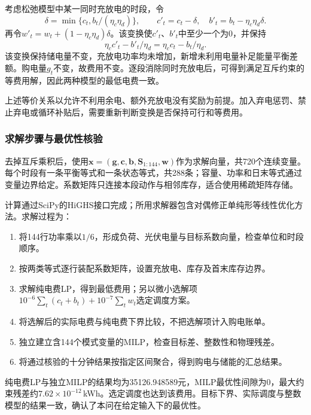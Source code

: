 考虑松弛模型中某一同时充放电的时段，令
\begin{equation}
 \delta=\min\{c_t,b_t/(\eta_c\eta_d)\},\qquad
 c'_t=c_t-\delta,\quad b'_t=b_t-\eta_c\eta_d\delta.\label{eq:cycle-remove}
\end{equation}
再令$w'_t=w_t+(1-\eta_c\eta_d)\delta$。该变换使$c'_t$、$b'_t$中至少一个为0，并保持
\begin{equation}
 \eta_cc'_t-b'_t/\eta_d=\eta_cc_t-b_t/\eta_d.
\end{equation}
该变换保持储电量不变，充放电功率均未增加，新增未利用电量补足能量平衡差额。购电量$g_t$不变，故费用不变。逐段消除同时充放电后，可得到满足互斥约束的等费用解，因此两种模型的最低电费一致。

上述等价关系以允许不利用余电、额外充放电没有奖励为前提。加入弃电惩罚、禁止弃电或循环补贴后，需要重新判断变换是否保持可行和等费用。

\subsubsection{求解步骤与最优性核验}
去掉互斥乘积后，使用$\boldsymbol x=(\boldsymbol g,\boldsymbol c,\boldsymbol b,\boldsymbol S_{1:144},\boldsymbol w)$作为求解向量，共720个连续变量。每个时段有一条平衡等式和一条状态等式，共288条；容量、功率和日末等式通过变量边界给定。系数矩阵只连接本段动作与相邻库存，适合使用稀疏矩阵存储。

计算通过SciPy的HiGHS接口完成；所用求解器包含对偶修正单纯形等线性优化方法。求解过程为：

\begin{enumerate}[label=步骤\arabic*,leftmargin=*,align=left]
 \item 将144行功率乘以$1/6$，形成负荷、光伏电量与目标系数向量，检查单位和时段顺序。
 \item 按两类等式逐行装配系数矩阵，设置充放电、库存及首末库存边界。
 \item 求解纯电费LP，得到最低费用；另以微小选解项$10^{-6}\sum_t(c_t+b_t)+10^{-7}\sum_tw_t$选定调度方案。
 \item 将选解后的实际电费与纯电费下界比较，不把选解项计入购电账单。
 \item 独立建立含144个模式变量的MILP，检查目标差、整数性和物理残差。
 \item 将通过核验的十分钟结果按指定区间聚合，得到购电与储能的汇总结果。
\end{enumerate}

纯电费LP与独立MILP的结果均为35126.948589元，MILP最优性间隙为0，最大约束残差约$7.62\times10^{-12}$\,kWh。选定调度也达到该费用。目标下界、实际调度与整数模型的结果一致，确认了本问在给定输入下的最优性。

